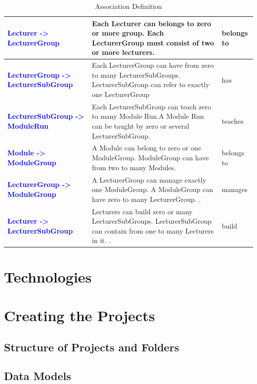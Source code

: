 \documentclass{scrartcl}
\begin{document}
\begin{table}[H]
\begin{center}
\begin{tabular}{| p{6.5cm}| p{6.5cm} |p{2.5cm}|}
 \textbf{\textcolor{blue}{ Lecturer -> LecturerGroup}}  & 
 Each Lecturer can belongs to zero or more group. 
 Each LecturerGroup must consist of two or more lecturers. &  belongs to\\ \hline
 
  \textbf{\textcolor{blue}{  LecturerGroup -> LecturerSubGroup}}  & 
 Each LecturerGroup can have from zero to many LecturerSubGroups.
 LecturerSubGroup can refer to exactly one LecturerGroup &  has\\ \hline
 
\textbf{\textcolor{blue}{LecturerSubGroup -> ModuleRun}}  &  Each LecturerSubGroup can teach zero to many Module Run.A Module Run can be taught by zero or several LecturerSubGroup.
 & teaches\\ \hline

\textbf{\textcolor{blue}{Module -> ModuleGroup}}  &  
A Module can belong to zero or one ModuleGroup. ModuleGroup can have from two to many Modules. & belongs to\\ \hline

\textbf{\textcolor{blue}{LecturerGroup -> ModuleGroup}}  &  A LecturerGroup can manage exactly one ModuleGroup. A ModuleGroup can have zero to many LecturerGroup.
. & manages\\ \hline

\textbf{\textcolor{blue}{Lecturer -> LecturerSubGroup}}  &  Lecturers can build zero or many LecturerSubGroups. LecturerSubGroup can contain from one to many Lecturers in it.
. & build\\ \hline
\end{tabular}
\end{center}
\caption{Association Definition}
\label{table2}
\end{table}


\section{Technologies}

\section{Creating the Projects}

\subsection{Structure of Projects and Folders}

\subsection{Data Models}
\end{document}
